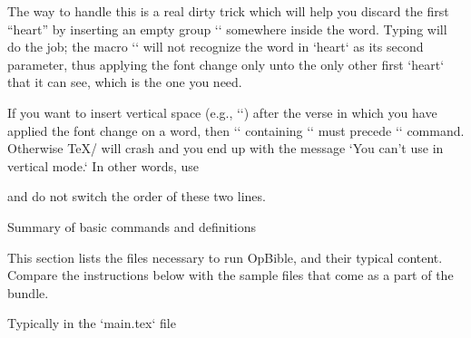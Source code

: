 {{The way to handle this is a real dirty trick which will help you discard the first “heart” by 
inserting an empty group `{}` somewhere inside the word.
Typing
\medskip
\begtt
{}
\endtt
\medskip
will do the job; the macro `\fmtfont`  will not recognize the word in `hea{}rt` as its second 
parameter, thus applying the font change only unto the only other first `heart` that it can see, 
which is the one you need. 


\watchout
If you want to insert vertical space (e.g., `\medskip`) after the verse in which you have 
applied the font change on a word, then `\fmtins` containing `\medskip` must precede `\fmtfont` 
command. Otherwise \TeX/ will crash and you end up with the message `You can't use \/ in vertical 
mode.`
In other words, use 

\begtt
{}
\endtt

and do not switch the order of these two lines.






%
\sec[sum] Summary of basic commands and definitions

This section lists the files necessary to run OpBible, and their typical content.
\recommended
Compare the instructions below with the sample files that come as a part of the bundle. 



\secc Typically in the `main.tex` file

}}

